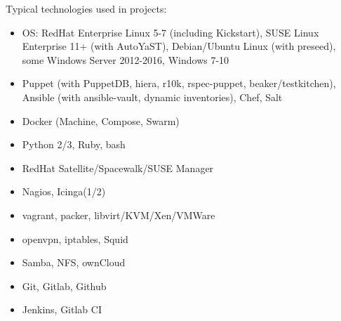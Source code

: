 \begin{cventries}
{\begin{cvitems}
        \item Typical technologies used in projects:
          \begin{itemize}
            \item OS: RedHat Enterprise Linux 5-7 (including Kickstart), SUSE Linux Enterprise 11+ (with AutoYaST), Debian/Ubuntu Linux (with preseed), some Windows Server 2012-2016, Windows 7-10
            \item Puppet (with PuppetDB, hiera, r10k, rspec-puppet, beaker/testkitchen), Ansible (with ansible-vault, dynamic inventories), Chef, Salt
            \item Docker (Machine, Compose, Swarm)
            \item Python 2/3, Ruby, bash
            \item RedHat Satellite/Spacewalk/SUSE Manager
            \item Nagios, Icinga(1/2)
            \item vagrant, packer, libvirt/KVM/Xen/VMWare
            \item openvpn, iptables, Squid
            \item Samba, NFS, ownCloud
            \item Git, Gitlab, Github
            \item Jenkins, Gitlab CI
          \end{itemize}
      \end{cvitems}
    }


\end{cventries}
